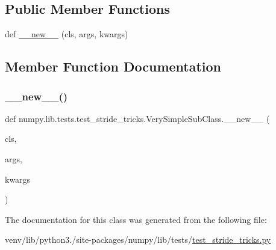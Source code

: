 \subsection*{Public Member Functions}
\begin{DoxyCompactItemize}
\item 
def \hyperlink{classnumpy_1_1lib_1_1tests_1_1test__stride__tricks_1_1VerySimpleSubClass_a6d4f20b9daf88447b107db03e2947217}{\+\_\+\+\_\+new\+\_\+\+\_\+} (cls, args, kwargs)
\end{DoxyCompactItemize}


\subsection{Member Function Documentation}
\mbox{\label{classnumpy_1_1lib_1_1tests_1_1test__stride__tricks_1_1VerySimpleSubClass_a6d4f20b9daf88447b107db03e2947217}} 
\subsubsection{\texorpdfstring{\+\_\+\+\_\+new\+\_\+\+\_\+()}{\_\_new\_\_()}}
{\footnotesize\ttfamily def numpy.\+lib.\+tests.\+test\+\_\+stride\+\_\+tricks.\+Very\+Simple\+Sub\+Class.\+\_\+\+\_\+new\+\_\+\+\_\+ (\begin{DoxyParamCaption}\item[{}]{cls,  }\item[{}]{args,  }\item[{}]{kwargs }\end{DoxyParamCaption})}



The documentation for this class was generated from the following file\+:\begin{DoxyCompactItemize}
\item 
venv/lib/python3./site-\/packages/numpy/lib/tests/\hyperlink{test__stride__tricks_8py}{test\+\_\+stride\+\_\+tricks.\+py}\end{DoxyCompactItemize}

